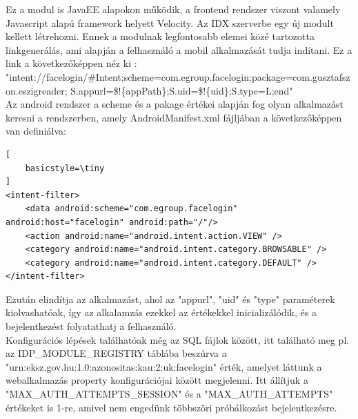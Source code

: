 Ez a modul is JavaEE alapokon működik, a frontend rendszer viszont valamely Javascript alapú framework helyett Velocity.
Az IDX szerverbe egy új modult kellett létrehozni. Ennek a modulnak legfontosabb elemei közé tartozotta linkgenerálás, ami alapján a felhasználó a mobil alkalmazását tudja indítani.
Ez a link a következőképpen néz ki : \\"intent://facelogin/\#Intent;scheme=com.egroup.facelogin;package=com.gusztafszon.eszigreader;
S.appurl=\$!\{appPath\};S.uid=\$!\{uid\};S.type=L;end"
\\ Az android rendszer a scheme és a pakage értékei alapján fog olyan alkalmazást keresni a rendszerben, amely AndroidManifest.xml fájljában a következőképpen van definiálva:
\begin{lstlisting}[
    basicstyle=\tiny
]
<intent-filter>
	<data android:scheme="com.egroup.facelogin" android:host="facelogin" android:path="/"/>
	<action android:name="android.intent.action.VIEW" />
	<category android:name="android.intent.category.BROWSABLE" />
	<category android:name="android.intent.category.DEFAULT" />
</intent-filter>
\end{lstlisting}

Ezután elindítja az alkalmazást, ahol az "appurl", "uid" és "type" paraméterek kiolvashatóak, így az alkalamzás ezekkel az értékekkel inicializálódik, és a bejelentkezést folyatathatj a felhasználó.
\\Konfigurációs lépések találhatóak még az SQL fájlok között, itt található meg pl. az IDP\_MODULE\_REGISTRY táblába beszúrva a "urn:eksz.gov.hu:1.0:azonositas:kau:2:uk:facelogin" érték, amelyet láttunk a webalkalmazás property konfigurációjai között megjelenni. Itt állítjuk a "MAX\_AUTH\_ATTEMPTS\_SESSION" és a "MAX\_AUTH\_ATTEMPTS" értékeket is 1-re, amivel nem engedünk többszöri próbálkozást bejelentkezésre.

